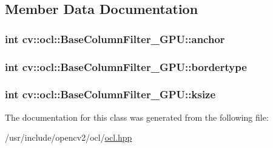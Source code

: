\subsection{Member Data Documentation}
\hypertarget{classcv_1_1ocl_1_1BaseColumnFilter__GPU_a8ff8cf954e28626afd0333ced6ddf174}{
\subsubsection[{anchor}]{\setlength{\rightskip}{0pt plus 5cm}int cv\-::ocl\-::\-Base\-Column\-Filter\-\_\-\-G\-P\-U\-::anchor}}\label{classcv_1_1ocl_1_1BaseColumnFilter__GPU_a8ff8cf954e28626afd0333ced6ddf174}
\hypertarget{classcv_1_1ocl_1_1BaseColumnFilter__GPU_ac1a0e9161e47cb7aea7be8de9a1ebcaf}{
\subsubsection[{bordertype}]{\setlength{\rightskip}{0pt plus 5cm}int cv\-::ocl\-::\-Base\-Column\-Filter\-\_\-\-G\-P\-U\-::bordertype}}\label{classcv_1_1ocl_1_1BaseColumnFilter__GPU_ac1a0e9161e47cb7aea7be8de9a1ebcaf}
\hypertarget{classcv_1_1ocl_1_1BaseColumnFilter__GPU_ac318a06ffc096ba9bc32d83912d6bf50}{
\subsubsection[{ksize}]{\setlength{\rightskip}{0pt plus 5cm}int cv\-::ocl\-::\-Base\-Column\-Filter\-\_\-\-G\-P\-U\-::ksize}}\label{classcv_1_1ocl_1_1BaseColumnFilter__GPU_ac318a06ffc096ba9bc32d83912d6bf50}


The documentation for this class was generated from the following file\-:\begin{DoxyCompactItemize}
\item 
/usr/include/opencv2/ocl/\hyperlink{ocl_2ocl_8hpp}{ocl.\-hpp}\end{DoxyCompactItemize}
